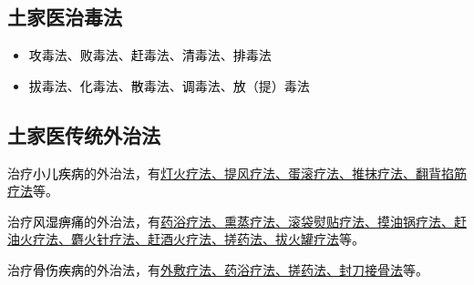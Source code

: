 \documentclass[cn,hazy,black,12pt,normal,founder]{elegantnote}
\newcommand{\redt}[1]{\textcolor{black}{{}#1}}      %
\begin{document}
\subsection{土家医治毒法}

\begin{itemize}
  \item \redt{攻}毒法、\redt{败}毒法、\redt{赶}毒法、\redt{清}毒法、\redt{排}毒法
  \item \redt{拔}毒法、\redt{化}毒法、\redt{散}毒法、\redt{调}毒法、\redt{放}（提）毒法
\end{itemize}

\subsection{土家医传统外治法}

治疗\redt{小儿疾病}的外治法，有\uline{灯火疗法、提风疗法、蛋滚疗法、推抹疗法、翻背掐筋} \\ \uline{疗法}等。

治疗\redt{风湿痹痛}的外治法，有\uline{药浴疗法、熏蒸疗法、滚袋熨贴疗法、摸油锅疗法、赶} \\ \uline{油火疗法、麝火针疗法、赶酒火疗法、搓药法、拔火罐疗法}等。

治疗\redt{骨伤疾病}的外治法，有\uline{外敷疗法、药浴疗法、搓药法、封刀接骨法}等。
\end{document}
